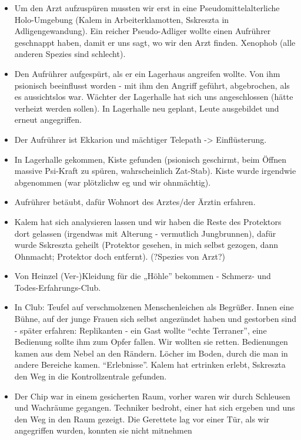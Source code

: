 \documentclass[11pt]{scrartcl}
\begin{document}
\begin{itemize}
\item
  Um den Arzt aufzuspüren mussten wir erst in eine
  Pseudomittelalterliche Holo-Umgebung (Kalem in Arbeiterklamotten,
  Sskreszta in Adligengewandung). Ein reicher Pseudo-Adliger wollte
  einen Aufrührer geschnappt haben, damit er uns sagt, wo wir den Arzt
  finden. Xenophob (alle anderen Spezies sind schlecht).
\item
  Den Aufrührer aufgespürt, als er ein Lagerhaus angreifen wollte. Von
  ihm psionisch beeinflusst worden - mit ihm den Angriff geführt,
  abgebrochen, als es aussichtslos war. Wächter der Lagerhalle hat sich
  uns angeschlossen (hätte verheizt werden sollen). In Lagerhalle neu
  geplant, Leute ausgebildet und erneut angegriffen.
\item
  Der Aufrührer ist Ekkarion und mächtiger Telepath -\textgreater{}
  Einflüsterung.
\item
  In Lagerhalle gekommen, Kiste gefunden (psionisch geschirmt, beim
  Öffnen massive Psi-Kraft zu spüren, wahrscheinlich Zat-Stab). Kiste
  wurde irgendwie abgenommen (war plötzlichw eg und wir ohnmächtig).
\item
  Aufrührer betäubt, dafür Wohnort des Arztes/der Ärztin erfahren.
\item
  Kalem hat sich analysieren lassen und wir haben die Reste des
  Protektors dort gelassen (irgendwas mit Alterung - vermutlich
  Jungbrunnen), dafür wurde Sskreszta geheilt (Protektor gesehen, in
  mich selbst gezogen, dann Ohnmacht; Protektor doch entfernt).
  (?Spezies von Arzt?)
\item
  Von Heinzel (Ver-)Kleidung für die „Höhle'' bekommen - Schmerz- und
  Todes-Erfahrungs-Club.
\item
  In Club: Teufel auf verschmolzenen Menschenleichen als Begrüßer. Innen
  eine Bühne, auf der junge Frauen sich selbst angezündet haben und
  gestorben sind - später erfahren: Replikanten - ein Gast wollte
  ``echte Terraner'', eine Bedienung sollte ihm zum Opfer fallen. Wir
  wollten sie retten. Bedienungen kamen aus dem Nebel an den Rändern.
  Löcher im Boden, durch die man in andere Bereiche kamen.
  ``Erlebnisse''. Kalem hat ertrinken erlebt, Sskreszta den Weg in die
  Kontrollzentrale gefunden.
\item
  Der Chip war in einem gesicherten Raum, vorher waren wir durch
  Schleusen und Wachräume gegangen. Techniker bedroht, einer hat sich
  ergeben und uns den Weg in den Raum gezeigt. Die Gerettete lag vor
  einer Tür, als wir angegriffen wurden, konnten sie nicht mitnehmen

\end{itemize}
\end{document}
